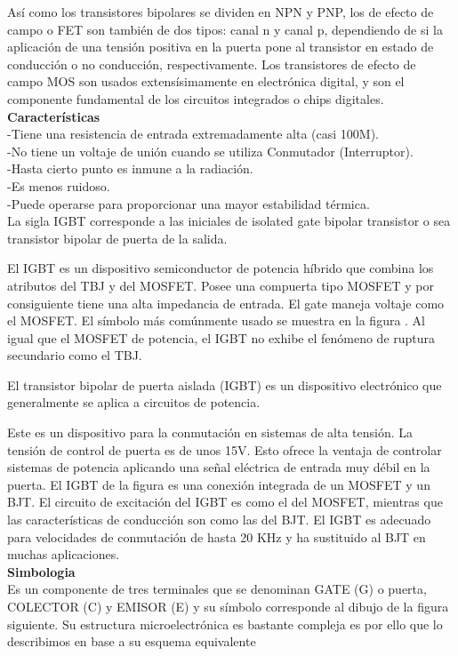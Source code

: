 \documentclass[10pt,a4paper]{article}
\begin{document}
Así como los transistores bipolares se dividen en NPN y PNP, los de efecto de campo o FET son también de dos tipos: canal n y canal p, dependiendo de si la aplicación de una tensión positiva en la puerta pone al transistor en estado de conducción o no conducción, respectivamente. Los transistores de efecto de campo MOS son usados extensísimamente en electrónica digital, y son el componente fundamental de los circuitos integrados o chips digitales.\\
\textbf{ Características}\\
-Tiene una resistencia de entrada extremadamente alta (casi 100M).\\
-No tiene un voltaje de unión cuando se utiliza Conmutador (Interruptor).\\
-Hasta cierto punto es inmune a la radiación.\\
-Es menos ruidoso.\\
-Puede operarse para proporcionar una mayor estabilidad térmica.\\
 La sigla IGBT corresponde a las iniciales de isolated gate bipolar transistor o sea transistor bipolar de puerta de la salida.

El IGBT es un dispositivo semiconductor de potencia híbrido que combina los atributos del TBJ y del MOSFET. Posee una compuerta tipo MOSFET y por consiguiente tiene una alta impedancia de entrada. El gate maneja voltaje como el MOSFET. El símbolo más comúnmente usado se muestra en la figura . Al igual que el MOSFET de potencia, el IGBT no exhibe el fenómeno de ruptura secundario como el TBJ.

El transistor bipolar de puerta aislada (IGBT) es un dispositivo electrónico que generalmente se aplica a circuitos de potencia.

Este es un dispositivo para la conmutación en sistemas de alta tensión. La tensión de control de puerta es de unos 15V. Esto ofrece la ventaja de controlar sistemas de potencia aplicando una señal eléctrica de entrada muy débil en la puerta.
El IGBT de la figura es una conexión integrada de un MOSFET y un BJT. El circuito de excitación del IGBT es como el del MOSFET, mientras que las características de conducción son como las del BJT. El IGBT es adecuado para velocidades de conmutación de hasta 20 KHz y ha sustituido al BJT en muchas aplicaciones.\\
\textbf{Simbologia}\\
Es un componente de tres terminales que se denominan GATE (G) o puerta, COLECTOR (C) y EMISOR (E) y su símbolo corresponde al dibujo de la figura siguiente.
Su estructura microelectrónica es bastante compleja es por ello que lo describimos en base a su esquema equivalente
\end{document}
